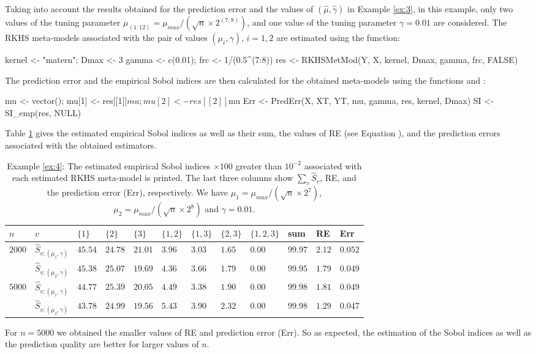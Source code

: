 Taking into account the results obtained for the prediction error and the values of $(\widehat{\mu},\widehat{\gamma})$ in Example \ref{ex:3}, in this example, only two values of the tuning parameter $\mu_{(1:12)}=\mu_{max}/(\sqrt{n}\times2^{(7:8)})$, and one value of the tuning parameter $\gamma=0.01$ are considered. The RKHS meta-models associated with the pair of values $(\mu_i,\gamma)$, $i=1,2$ are estimated using the  function:
\begin{example}
kernel <- "matern"; Dmax <- 3
gamma <- c(0.01); frc <- 1/(0.5^(7:8))
res <- RKHSMetMod(Y, X, kernel, Dmax, gamma, frc, FALSE)
\end{example}
The prediction error and the empirical Sobol indices are then calculated for the obtained meta-models using the functions  and :
\begin{example}
mu <- vector(); mu[1] <- res[[1]]$mu; mu[2] <- res[[2]]$mu
Err <- PredErr(X, XT, YT, mu, gamma, res, kernel, Dmax)
SI <- SI_emp(res, NULL)
\end{example}
Table \ref{tab:SIex4} gives the estimated empirical Sobol indices as well as their sum, the values of RE (see Equation ), and the prediction errors associated with the obtained estimators.
\begin{table}[h!]
\centering
\small{
{\setlength{\tabcolsep}{4pt}
\begin{tabular}{l|l|lllllll|l|l|l} 
$n$ & $v$    & $\{1\}$ & $\{2\}$ & $\{3\}$ & $\{1,2\}$ & $\{1,3\}$ & $\{2,3\}$ & $\{1,2,3\}$ & sum & RE & Err \\ \hline
\multirow{2}{2em}{$2000$}  & $\widehat{S}_{v;(\mu_1,\gamma)}$  & $45.54$  & $24.78$  & $21.01$  & $3.96$     & $3.03$     & $1.65$     & $0.00$       & $99.97$ & $2.12$ & $0.052$\\

& $\widehat{S}_{v;(\mu_2,\gamma)}$   & $45.38$  & $25.07$  & $19.69$  & $4.36$     & $3.66$     & $1.79$     & $0.00$       & $ 99.95$ & $1.79$ & $0.049$\\ \hline

\multirow{2}{2em}{$5000$}  & $\widehat{S}_{v;(\mu_1,\gamma)}$  & $44.77$  & $25.39$  & $20.05$  & $4.49$     & $3.38$     & $1.90$     & $0.00$       & $99.98$ & $1.81$ & $0.049$\\

& $\widehat{S}_{v;(\mu_2,\gamma)}$   & $43.78$  & $24.99$  & $19.56$  & $5.43$     & $3.90$     & $2.32$     & $0.00$       & $99.98$ & $1.29$ & $0.047$
\end{tabular}}}
\caption{Example \ref{ex:4}: The estimated empirical Sobol indices $\times100$ greater than $10^{-2}$ associated with each estimated RKHS meta-model is printed. The last three columns show $\sum_v\widehat{S}_v$, RE, and the prediction error (Err), respectively. We have $\mu_1=\mu_{max}/(\sqrt{n}\times 2^{7})$, $\mu_2=\mu_{max}/(\sqrt{n}\times 2^{8})$ and $\gamma=0.01$.}
\label{tab:SIex4}
\end{table} 
For $n=5000$ we obtained the smaller values of RE and prediction error (Err). So as expected, the estimation of the Sobol indices as well as the prediction quality are better for larger values of $n$.


